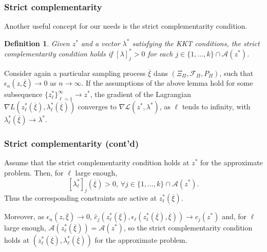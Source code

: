 \documentclass{beamer}
\newtheorem{defi}{Definition}
\begin{document}
\begin{frame}
\frametitle{Strict complementarity}

Another useful concept for our needs is the strict complementarity condition.

\begin{defi}
Given $z^*$ and a vector $\lambda^*$ satisfying the KKT conditions, the strict complementarity condition holds if %
$[\lambda]_j^* > 0$ for each $j \in \lbrace 1,\ldots,k \rbrace \cap \mathcal{A}(z^*)$.
\end{defi}

\mbox{}

Consider again a particular sampling process $\overline{\xi}$ dans $(\Xi_{\Pi}, \mathcal{F}_{\Pi}, P_{\Pi})$, such that $\epsilon_n (z, \overline{\xi} ) \rightarrow 0$ as $n \rightarrow \infty$. 
If the assumptions of the above lemma hold for some subsequence $\lbrace z_{\ell}^* \rbrace_{\ell = 1}^{\infty} \rightarrow z^*$, the gradient of the Lagrangian $\nabla L\left( z^*_{\ell} ( \overline{\xi} ), \lambda_{\ell}^* ( \overline{\xi} ) \right)$ converges to $\nabla \mathcal{L} ( z^*, \lambda^* )$, as $\ell$ tends to infinity, with $\lambda_{\ell}^*(\overline{\xi}) \rightarrow \lambda^*$.

\end{frame}

\begin{frame}
\frametitle{Strict complementarity (cont'd)}

Assume that the strict complementarity condition holds at $z^*$ for the approximate problem.
Then, for $\ell$ large enough,
$$
[\lambda^*_{\ell}]_j(\overline{\xi}) > 0,\, \forall j \in \lbrace 1,\ldots,k \rbrace \cap \mathcal{A} ( z^* ) .
$$
Thus the corresponding constraints are active at $z^*_{\ell}(\overline{\xi})$.

\mbox{}

Moreover, as $\epsilon_n (z, \overline{\xi} ) \rightarrow 0$,
$\hat{c}_j \left( z^*_{\ell}(\overline{\xi}),
\epsilon_{\ell}(z^*_{\ell}(\overline{\xi}),\overline{\xi}) \right) \rightarrow
c_j ( z^* )$ and, for $\ell$ large enough,
$\mathcal{A} \left( z^*_{\ell}(\overline{\xi}) \right) = \mathcal{A} (
z^* )$, so the strict complementarity condition holds at $\left(
  z^*_{\ell}(\overline{\xi}), \lambda_{\ell}^*(\overline{\xi})
\right)$ for the approximate problem.



\end{frame}
\end{document}
